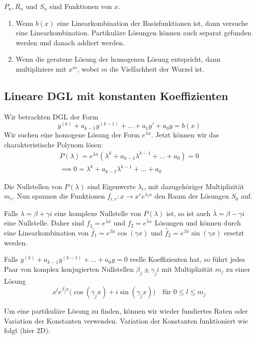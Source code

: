 \documentclass[a4paper,10pt]{article}
\begin{document}
\(P_n, R_n \) und \(S_n\) sind Funktionen von \(x\). 

\begin{enumerate}
  \item Wenn \(b(x)\) eine Linearkombination der Basisfunktionen ist, dann versuche eine Linearkombination. Partikuläre Lösungen können auch separat gefunden werden und danach addiert werden.
  \item Wenn die geratene Lösung der homogenen Lösung entspricht, dann multipliziere mit \(x^m\), wobei \(m\) die Vielfachheit der Wurzel ist.
\end{enumerate}

\subsection{Lineare DGL mit konstanten Koeffizienten}
Wir betrachten DGL der Form
\[y^{(k)} + a_{k-1} y^{(k-1)} + \ldots + a_1 y' + a_0 y = b(x)\]
Wir suchen eine homogene Lösung der Form \(e^{\lambda x}\). Jetzt können wir das charakteristische Polynom lösen:
\begin{align*}
  P(\lambda) = e^{\lambda x} \left(\lambda^k + a_{k-1}\lambda^{k-1} + \ldots + a_0\right) = 0 \\ 
  \implies 0 = \lambda^k + a_{k-1}\lambda^{k-1} + \ldots+ a_0
\end{align*}

Die Nullstellen von \(P(\lambda)\) sind Eigenwerte \(\lambda_i\), mit dazugehöriger Multiplizität \(m_r\). Nun spannen die Funktionen \(f_{i,r} : x \to x^r e^{\lambda_i x}\) den Raum der Lösungen \(S_0\) auf.

Falls \(\lambda = \beta + \gamma i\) eine komplexe Nullstelle von \(P(\lambda)\) ist, so ist auch 
\(\bar{\lambda} = \beta - \gamma i\) eine Nullstelle. Daher sind \(f_1 = e^{\lambda x}\) und \(f_2 = e^{\bar{\lambda} x}\) Lösungen und können durch eine Linearkombination von \(\tilde{f_1} = e^{\beta x} \cos(\gamma x)\) und \(\tilde{f_2} = e^{\beta x} \sin(\gamma x)\) ersetzt werden.

Falls \(y^{(k)} + a_{k-1}y^{(k-1)} + \dots + a_0 y = 0\) reelle Koeffizienten hat, so führt jedes Paar von komplex konjugierten Nullstellen $\beta_j \pm \gamma_j i$ mit Multiplizität $m_j$ zu einer Lösung
\[x^l e^{\beta_j x} \Big( \cos(\gamma_j x) + i \sin(\gamma_j x) \Big) \quad \text{für }0 \leq l \leq m_j\]

Um eine partikuläre Lösung zu finden, können wir wieder fundiertes Raten oder Variation der Konstanten verwenden. 
Variation der Konstanten funktioniert wie folgt (hier 2D):
\end{document}
